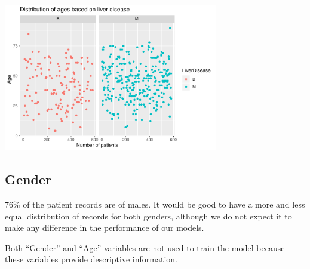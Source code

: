 \documentclass[]{article}
\newenvironment{Shaded}{\begin{snugshade}}{\end{snugshade}}
\newcommand{\CommentTok}[1]{\textcolor[rgb]{0.56,0.35,0.01}{\textit{#1}}}
\newcommand{\DataTypeTok}[1]{\textcolor[rgb]{0.13,0.29,0.53}{#1}}
\newcommand{\KeywordTok}[1]{\textcolor[rgb]{0.13,0.29,0.53}{\textbf{#1}}}
\newcommand{\NormalTok}[1]{#1}
\newcommand{\OperatorTok}[1]{\textcolor[rgb]{0.81,0.36,0.00}{\textbf{#1}}}
\newcommand{\StringTok}[1]{\textcolor[rgb]{0.31,0.60,0.02}{#1}}
\begin{document}
\begin{Shaded}
\end{Shaded}

\begin{center}
\includegraphics[width=0.7\textwidth]{LiverDisease_files/figure-latex/unnamed-chunk-12-1.pdf}
\end{center}

\subsection{Gender}

76\% of the patient records are of males. It would be good to have a
more and less equal distribution of records for both genders, although
we do not expect it to make any difference in the performance of our
models.

Both ``Gender'' and ``Age'' variables are not used to train the model because these variables provide descriptive information.
\end{document}

